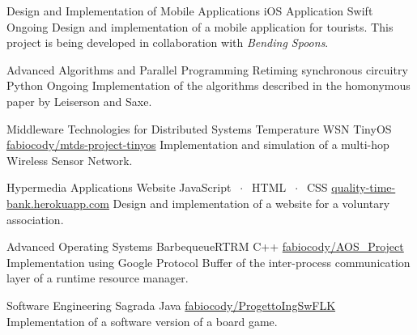 

\begin{cventries}

\cventry
    {Design and Implementation of Mobile Applications}
    {iOS Application}
    {Swift}
    {Ongoing}
    {Design and implementation of a mobile application for tourists. This project is being developed in collaboration with \textit{Bending Spoons}.}
    
\cventry
    {Advanced Algorithms and Parallel Programming}
    {Retiming synchronous circuitry}
    {Python}
    {Ongoing}
    {Implementation of the algorithms described in the homonymous paper by Leiserson and Saxe.}
    
\cventry
    {Middleware Technologies for Distributed Systems}
    {Temperature WSN}
    {TinyOS}
    {\href{https://github.com/fabiocody/mtds-project-tinyos}{\faGithub\acvHeaderIconSep fabiocody/mtds-project-tinyos}}
    {Implementation and simulation of a multi-hop Wireless Sensor Network.}
    
\cventry
    {Hypermedia Applications}
    {Website}
    {JavaScript $\;\cdot\;$ HTML $\;\cdot\;$ CSS}
    {\href{https://quality-time-bank.herokuapp.com}{\faGlobe\acvHeaderIconSep quality-time-bank.herokuapp.com}}
    {Design and implementation of a website for a voluntary association.}
    
\cventry
    {Advanced Operating Systems}
    {BarbequeueRTRM}
    {C++}
    {\href{https://github.com/fabiocody/AOS\_Project/tree/protobuf}{\faGithub\acvHeaderIconSep fabiocody/AOS\_Project}}
    {Implementation using Google Protocol Buffer of the inter-process communication layer of a runtime resource manager.}

\begin{comment}
\cventry
    {Internet of Things}
    {Smart bins}
    {Contiki}
    {\href{https://github.com/fabiocody/CodiglioniNicheliniIoT}{\faGithub\acvHeaderIconSep fabiocody/CodiglioniNicheliniIoT}}
    {Implementation and simulation of a smart bins system.}
\fi
\end{comment}
    
\cventry
    {Software Engineering}
    {Sagrada}
    {Java}
    {\href{https://github.com/fabiocody/ProgettoIngSwFLK}{\faGithub\acvHeaderIconSep fabiocody/ProgettoIngSwFLK}}
    {Implementation of a software version of a board game.}
\end{cventries}
